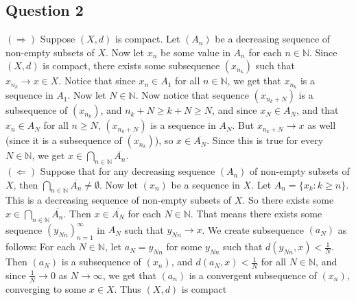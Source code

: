 \documentclass[letterpaper, 11pt]{article}
\newcommand{\N}{\mathbb{N}}   %
\newcommand{\1}{\mathds{1}}	%
\theoremstyle{definition}
\begin{document}
\subsection*{Question 2}
$(\Rightarrow)$ Suppose $(X,d)$ is compact. Let $(A_n)$ be a decreasing sequence of non-empty subsets of $X$. Now let $x_n$ be some value in $A_n$ for each $n \in \N$. Since $(X,d)$ is compact, there exists some subsequence $(x_{n_k})$ such that $x_{n_k} \to x \in X$. Notice that since $x_n \in A_1$ for all $n \in \N$, we get that $x_{n_k}$ is a sequence in $A_1$. Now let $N \in \N$. Now notice that sequence $(x_{n_k + N})$ is a subsequence of $(x_{n_k})$, and $n_k + N \ge k + N \ge N$, and since $x_N \in A_N$, and that $x_n \in A_N$ for all $n \ge N$, $(x_{n_k + N})$ is a sequence in $A_N$. But $x_{n_k + N} \to x$ as well (since it is a subsequence of $(x_{n_k})$), so $x \in \overline{A_N}$. Since this is true for every $N \in \N$, we get $x \in \bigcap _{n \in \N}\overline{A_n}$. \\ 
$(\Leftarrow)$ Suppose that for any decreasing sequence $(A_n)$ of non-empty subsets of $X$, then $\bigcap _{n \in \N} \overline{A_n} \ne \emptyset$. Now let $(x_n)$ be a sequence in $X$. Let $A_n = \{x_k : k \ge n\}$. This is a decreasing sequence of non-empty subsets of $X$. So there exists some $x \in \bigcap _{n \in \N} \overline{A_n}$. Then $x \in \overline{A_N}$ for each $N \in \N$. That means there exists some sequence $(y_{Nn})_{n=1}^\infty$ in $A_N$ such that $y_{Nn} \to x$. We create subsequence $(a_N)$ as follows: For each $N \in \N$, let $a_N = y_{Nn}$ for some $y_{Nn}$ such that $d(y_{Nn}, x) < \frac{1}{N}$. Then $(a_N)$ is a subsequence of $(x_n)$, and $d(a_N, x) < \frac{1}{N}$ for all $N \in \N$, and since $\frac{1}{N} \to 0$ as $N \to \infty$, we get that $(a_n)$ is a convergent subsequence of $(x_n)$, converging to some $x \in X$. Thus $(X,d)$ is compact
\end{document}
